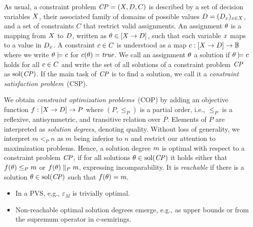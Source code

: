 As usual, a constraint problem $\mathit{CP} = (X, D, C)$ is described
by a set of decision variables $X$, their associated family of domains of possible values
$D = (D_x)_{x \in X}$, and a set of constraints $C$ that restrict valid assignments.
An assignment $\theta$ is a mapping from $X$ to $D$, written as $\theta \in [X \to D]$, such that each variable $x$ maps to
a value in $D_x$. A constraint $c \in C$ is understood as a map $c : [X \to D] \to \mathbb{B}$
where we write $\theta \models c$ for $c(\theta) = \mathit{true}$. We call
an assignment $\theta$ a solution if $\theta \models c$ holds for all $c \in C$ and
write the set of all solutions of a constraint problem $\mathit{CP}$ as $\mathrm{sol}(\mathit{CP})$. If the main task of $\mathit{CP}$ is
to find a solution, we call it a \emph{constraint satisfaction problem}~(CSP).

We obtain \emph{constraint optimization problems}~(COP) by adding an objective function $f : [X \to D] \to P$
where $(P, \leq_P)$ is a partial order, i.e., $\leq_P$ is a reflexive, antisymmetric, and transitive relation over $P$.
Elements of $P$ are interpreted as \emph{solution degrees}, denoting quality. Without loss of generality, we interpret
$m <_P n$ as $m$ being inferior to $n$ and restrict our attention to maximization problems.
Hence, a solution degree $m$ is optimal with respect to a constraint problem $\mathit{CP}$, 
if for all solutions $\theta \in \mathrm{sol}(\mathit{CP})$ it holds either that $f(\theta) \leq_P m$ or 
$f(\theta) \parallel_P m$, expressing incomparability.  It is \emph{reachable} if there is a solution $\theta \in \mathrm{sol}(\mathit{CP})$ such that 
$f(\theta) = m$. 

\begin{itemize}
\item In a PVS, e.g., $\varepsilon_M$ is trivially optimal.
\item Non-reachable optimal solution degrees emerge, e.g., as
 upper bounds or from the supremum operator in c-semirings. 


\end{itemize}